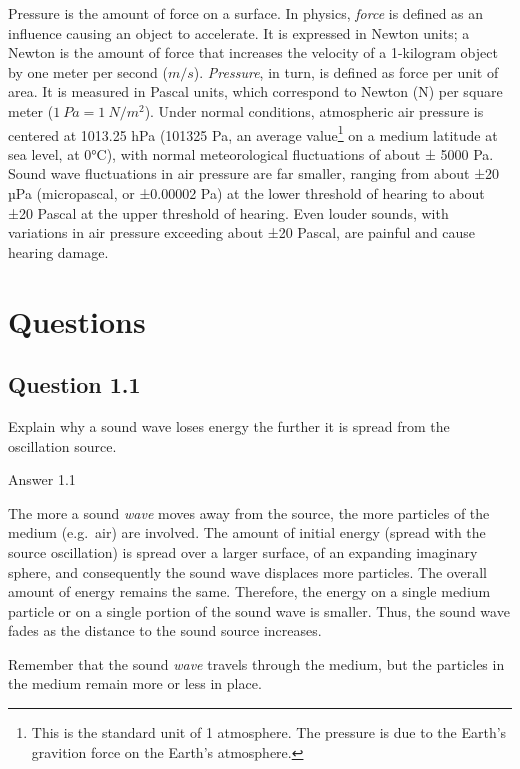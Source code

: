 \documentclass[
]{book}
\begin{document}
Pressure is the amount of force on a surface. In physics, \emph{force} is defined as an influence causing an object to accelerate. It is expressed in Newton units; a Newton is the amount of force that increases the velocity of a 1-kilogram object by one meter per second (\(m/s\)). \emph{Pressure}, in turn, is defined as force per unit of area. It is measured in Pascal units, which correspond to Newton (N) per square meter (\(1\ Pa = 1\ N/m^2\)).
Under normal conditions, atmospheric air pressure is centered at 1013.25 hPa (101325 Pa, an average value\footnote{This is the standard unit of 1 atmosphere. The pressure is due to the Earth's gravition force on the Earth's atmosphere.} on a medium latitude at sea level, at 0°C), with normal meteorological fluctuations of about ± 5000 Pa. Sound wave fluctuations in air pressure are far smaller, ranging from about ±20 µPa (micropascal, or ±0.00002 Pa) at the lower threshold of hearing to about ±20 Pascal at the upper threshold of hearing. Even louder sounds, with variations in air pressure exceeding about ±20 Pascal, are painful and cause hearing damage.

\label{questions-soundwaves}
\section*{Questions}\label{questions-1}

\subsection*{Question 1.1}\label{question-1.1}

Explain why a sound wave loses energy the further it is spread from the oscillation source.

Answer 1.1

The more a sound \emph{wave} moves away from the source, the more particles of the medium (e.g.~air) are involved. The amount of initial energy (spread with the source oscillation) is spread over a larger surface, of an expanding imaginary sphere, and consequently the sound wave displaces more particles. The overall amount of energy remains the same. Therefore, the energy on a single medium particle or on a single portion of the sound wave is smaller. Thus, the sound wave fades as the distance to the sound source increases.

Remember that the sound \emph{wave} travels through the medium, but the particles in the medium remain more or less in place.
\end{document}
